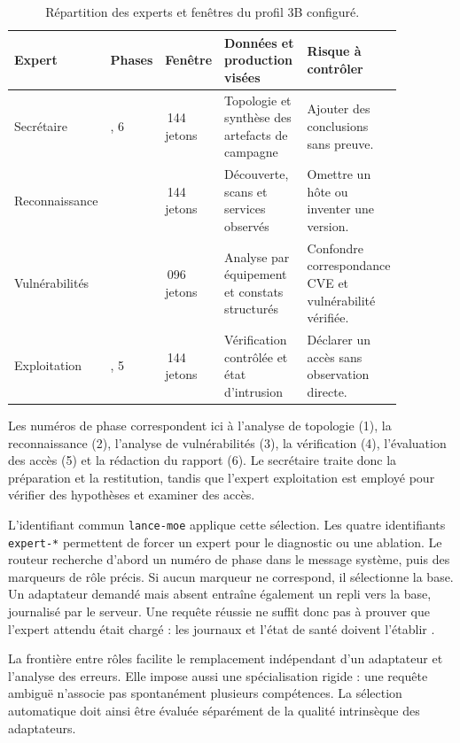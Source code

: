 \documentclass[11pt,a4paper]{article}
\begin{document}
\begin{table}[htbp]
\centering
\small
\caption{Répartition des experts et fenêtres du profil 3B configuré.}
\label{tab:ml-experts}
\begin{tabular}{>{\raggedright\arraybackslash}p{0.15\linewidth}>{\raggedright\arraybackslash}p{0.07\linewidth}>{\raggedright\arraybackslash}p{0.12\linewidth}>{\raggedright\arraybackslash}p{0.29\linewidth}>{\raggedright\arraybackslash}p{0.24\linewidth}}
\toprule
Expert & Phases & Fenêtre & Données et production visées & Risque à contrôler \\
\midrule
Secrétaire & 1, 6 & 6\,144 jetons & Topologie et synthèse des artefacts de campagne & Ajouter des conclusions sans preuve. \\
Reconnaissance & 2 & 6\,144 jetons & Découverte, scans et services observés & Omettre un hôte ou inventer une version. \\
Vulnérabilités & 3 & 4\,096 jetons & Analyse par équipement et constats structurés & Confondre correspondance CVE et vulnérabilité vérifiée. \\
Exploitation & 4, 5 & 6\,144 jetons & Vérification contrôlée et état d'intrusion & Déclarer un accès sans observation directe. \\
\bottomrule
\end{tabular}
\end{table}

Les numéros de phase correspondent ici à l'analyse de topologie (1), la
reconnaissance (2), l'analyse de vulnérabilités (3), la vérification (4),
l'évaluation des accès (5) et la rédaction du rapport (6). Le secrétaire traite
donc la préparation et la restitution, tandis que l'expert exploitation est
employé pour vérifier des hypothèses et examiner des accès.

L'identifiant commun \texttt{lance-moe} applique cette sélection. Les quatre
identifiants \texttt{expert-*} permettent de forcer un expert pour le diagnostic
ou une ablation. Le routeur recherche d'abord un numéro de phase dans le message
système, puis des marqueurs de rôle précis. Si aucun marqueur ne correspond,
il sélectionne la base. Un adaptateur demandé mais absent entraîne également
un repli vers la base, journalisé par le serveur. Une requête réussie ne suffit
donc pas à prouver que l'expert attendu était chargé : les journaux et l'état de
santé doivent l'établir \cite{ml-server}.

La frontière entre rôles facilite le remplacement indépendant d'un adaptateur
et l'analyse des erreurs. Elle impose aussi une spécialisation rigide : une
requête ambiguë n'associe pas spontanément plusieurs compétences. La sélection
automatique doit ainsi être évaluée séparément de la qualité intrinsèque des
adaptateurs.
\end{document}
